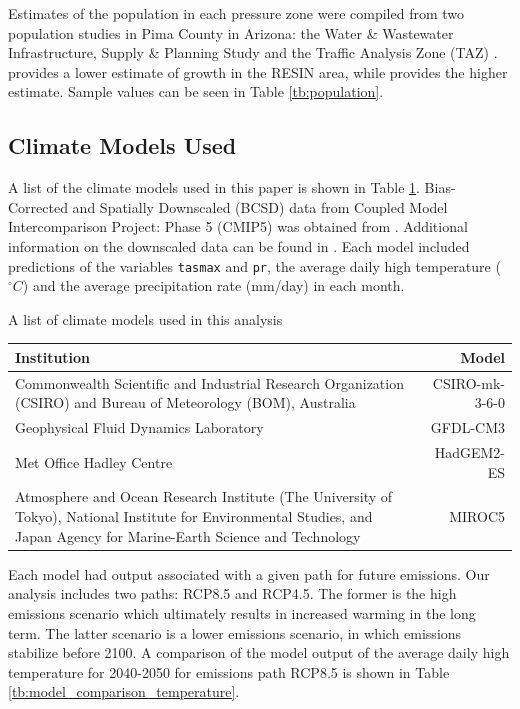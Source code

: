 \documentclass[opre,nonblindrev]{informs3} %
\begin{document}
Estimates of the population in each pressure zone were compiled from two population studies in Pima County in Arizona: the Water \& Wastewater Infrastructure, Supply \& Planning Study \citep{wisp} and the Traffic Analysis Zone (TAZ) \citep{taz}.
\cite{taz} provides a lower estimate of growth in the RESIN area, while \cite{wisp} provides the higher estimate.
Sample values can be seen in Table \ref{tb:population}.

\subsection{Climate Models Used}

A list of the climate models used in this paper is shown in Table \ref{tb:climate_models}.
Bias-Corrected and Spatially Downscaled (BCSD) data from Coupled Model Intercomparison Project: Phase 5 (CMIP5) was obtained from \cite{cmip5}.
Additional information on the downscaled data can be found in \cite{bcsdreclamation}.
Each model included predictions of the variables \texttt{tasmax} and \texttt{pr}, the average daily high temperature ($^\circ C$) and the average precipitation rate (mm/day) in each month.

\begin{table}
	\TABLE
	{
		A list of climate models used in this analysis
		\label{tb:climate_models}
	}
	{\begin{tabular}{p{}|r}
		\hline
		Institution & Model \\
		\hline
		\hline
		Commonwealth Scientific and Industrial Research Organization (CSIRO) and Bureau of Meteorology (BOM), Australia & CSIRO-mk-3-6-0 \\
		\hline
		Geophysical Fluid Dynamics Laboratory & GFDL-CM3 \\
		\hline
		Met Office Hadley Centre & HadGEM2-ES \\
		\hline
		Atmosphere and Ocean Research Institute (The University of Tokyo), National Institute for Environmental Studies, and Japan Agency for Marine-Earth Science and Technology & MIROC5 \\
		\hline
	\end{tabular}}
	{}
\end{table}

Each model had output associated with a given path for future emissions.
Our analysis includes two paths: RCP8.5 and RCP4.5.
The former is the high emissions scenario which ultimately results in increased warming in the long term.
The latter scenario is a lower emissions scenario, in which emissions stabilize before 2100.
A comparison of the model output of the average daily high temperature for 2040-2050 for emissions path RCP8.5 is shown in Table \ref{tb:model_comparison_temperature}.
\end{document}

